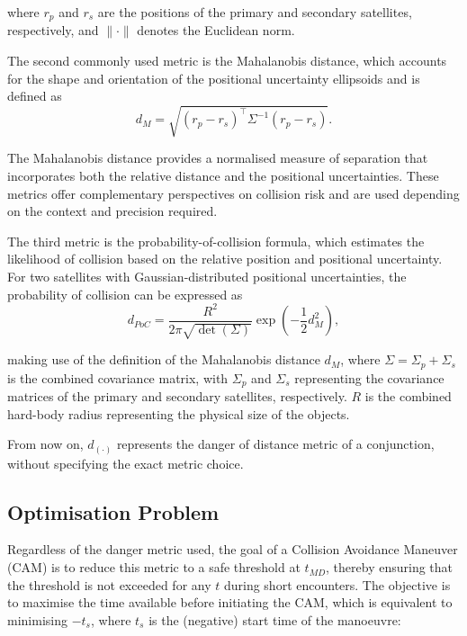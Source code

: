 \documentclass[letterpaper, preprint, paper,11pt]{AAS}	%
\begin{document}
where \( r_p \) and \( r_s \) are the positions of the primary and secondary satellites, respectively, and \( \| \cdot \| \) denotes the Euclidean norm. 

The second commonly used metric is the Mahalanobis distance, which accounts for the shape and orientation of the positional uncertainty ellipsoids and is defined as
\begin{equation}\label{eq:MD}
	d_M = \sqrt{(r_p - r_s)^\top \Sigma^{-1} (r_p - r_s)}.
\end{equation}

The Mahalanobis distance provides a normalised measure of separation that incorporates both the relative distance and the positional uncertainties. These metrics offer complementary perspectives on collision risk and are used depending on the context and precision required.

The third metric is the probability-of-collision formula, which estimates the likelihood of collision based on the relative position and positional uncertainty. For two satellites with Gaussian-distributed positional uncertainties, the probability of collision can be expressed as
\begin{equation}\label{eq:PoC}
d_{PoC} = \frac{R^2}{2 \pi \sqrt{\det(\Sigma)}} \exp\left( -\frac{1}{2} d_M^2 \right),
\end{equation}

making use of the definition of the Mahalanobis distance $d_M$, where \( \Sigma = \Sigma_p + \Sigma_s \) is the combined covariance matrix, with \( \Sigma_p \) and \( \Sigma_s \) representing the covariance matrices of the primary and secondary satellites, respectively. $R$ is the combined hard-body radius representing the physical size of the objects.

From now on, $d_{(\cdot)}$ represents the danger of distance metric of a conjunction, without specifying the exact metric choice.

\subsection{Optimisation Problem}

Regardless of the danger metric used, the goal of a Collision Avoidance Maneuver (CAM) is to reduce this metric to a safe threshold at \( t_{MD} \), thereby ensuring that the threshold is not exceeded for any \( t \) during short encounters. The objective is to maximise the time available before initiating the CAM, which is equivalent to minimising $-t_s$, where $t_s$ is the (negative) start time of the manoeuvre:
\end{document}

